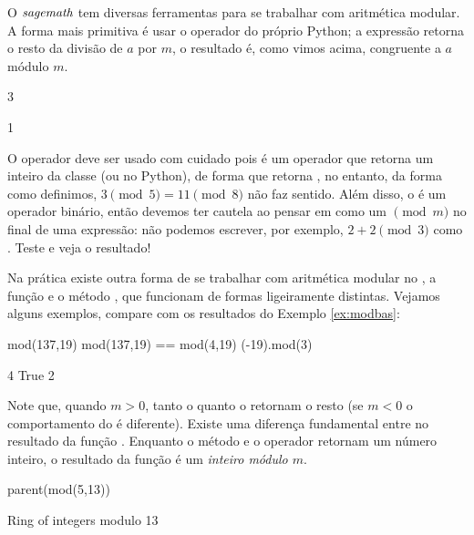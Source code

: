 
O $\emph{sagemath}$ tem diversas ferramentas para se trabalhar com aritmética modular.
A forma mais primitiva é usar o operador \ils{\%} do próprio Python; a
expressão  retorna o resto da divisão de $a$ por $m$,
o resultado é, como vimos acima, congruente a $a$ módulo $m$.

\begin{sageinput}
3 %
\end{sageinput}
\begin{sageoutput}
1
\end{sageoutput}

O operador \ils{\%} deve ser usado com cuidado pois é um operador
que retorna um inteiro da classe  (ou  no Python),
de forma que  retorna , no entanto,
da forma como definimos, $3 \pmod 5 = 11 \pmod 8$ não faz sentido. Além
disso, o \ils{\%} é um operador binário, então devemos
ter cautela ao pensar em  como um $\pmod m$ no final
de uma expressão: não podemos escrever, por exemplo,
$2 + 2 \pmod 3$ como . Teste e veja o resultado!

Na prática existe outra forma de se trabalhar com aritmética
modular no \sage, a função  e o método ,
que funcionam de formas ligeiramente distintas.
Vejamos alguns exemplos, compare com os resultados do Exemplo
 
\ref{ex:modbas}:
\begin{sageinput}
mod(137,19)
mod(137,19) == mod(4,19)
(-19).mod(3)
\end{sageinput}
\begin{sageoutput}
4
True
2
\end{sageoutput}

Note que, quando $m>0$, tanto o  quanto o \ils{\%}
retornam o resto (se $m<0$ o comportamento do \ils{\%} 
é diferente). Existe uma diferença fundamental entre
no resultado da função . Enquanto o método 
e o operador \ils{\%} retornam um número inteiro, o resultado
da função  é um \emph{inteiro módulo $m$}.
\begin{sageinput}
parent(mod(5,13))
\end{sageinput}
\begin{sageoutput}
Ring of integers modulo 13
\end{sageoutput}

